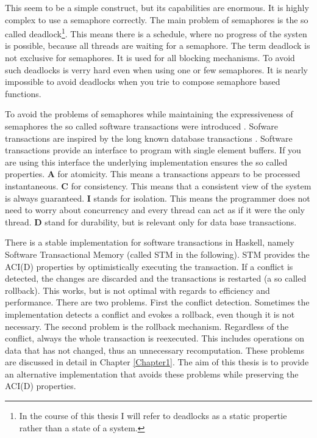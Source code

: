 This seem to be a simple construct, but its capabilities are enormous. It is highly complex to use a semaphore correctly.
The main problem of semaphores is the so called deadlock\footnote{In the course of this thesis I will refer to deadlocks as a static propertie rather than a state of a system.}. 
This means there is a schedule, where no progress of the systen is possible, because all threads are waiting for a semaphore. The term deadlock is not exclusive for semaphores.
It is used for all blocking mechanisms. To avoid such deadlocks is verry hard even when using one or few semaphores. 
It is nearly impossible to avoid deadlocks when you trie to compose semaphore based functions.

To avoid the problems of semaphores while maintaining the expressiveness of semaphores the so called software transactions were introduced \parencite{STMBase}.
Sofware transactions are inspired by the long known database transactions \parencite{DBTrans}. Software transactions provide an interface to program with 
single element buffers. If you are using this interface the underlying implementation ensures the so called  properties. \textbf{A} for atomicity.
This means a transactions appears to be processed instantaneous. \textbf{C} for consistency. This means that a consistent view of the system is always guaranteed.
\textbf{I} stands for isolation. This means the programmer does not need to worry about concurrency and every thread can act as if it were the only thread. 
\textbf{D} stand for durability, but is relevant only for data base transactions. 

There is a stable implementation for software transactions in Haskell, namely Software Transactional Memory (called STM in the following). STM provides the ACI(D)
properties by optimistically executing the transaction. If a conflict is detected, the changes are discarded and the transactions is restarted (a so called rollback). 
This works, but is not optimal with regards to efficiency and performance. There are two problems. First the conflict detection. Sometimes the implementation detects 
a conflict and evokes a rollback, even though it is not necessary. The second problem is the rollback mechanism. Regardless of the conflict, always the whole transaction
is reexecuted. This includes operations on data that has not changed, thus an unnecessary recomputation. These problems are discussed in detail in Chapter \ref{Chapter1}. 
The aim of this thesis is to provide an alternative implementation that avoids these problems while preserving the ACI(D) properties.
